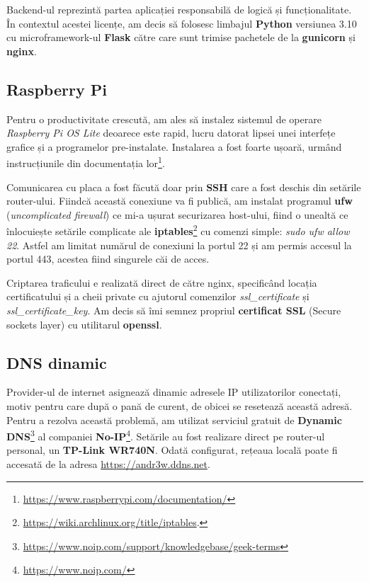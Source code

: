Backend-ul reprezintă partea aplicației responsabilă de logică și funcționalitate. În contextul acestei licențe, am decis să folosesc limbajul \textbf{Python} versiunea 3.10 cu microframework-ul \textbf{Flask} către care sunt trimise pachetele de la \textbf{gunicorn} și \textbf{nginx}.

\subsection{Raspberry Pi}

Pentru o productivitate crescută, am ales să instalez sistemul de operare \emph{Raspberry Pi OS Lite} deoarece este rapid, lucru datorat lipsei unei interfețe grafice și a programelor pre-instalate. Instalarea a fost foarte ușoară, urmând instrucțiunile din documentația lor\footnote{\url{https://www.raspberrypi.com/documentation/}}.

Comunicarea cu placa a fost făcută doar prin \textbf{SSH} care a fost deschis din setările router-ului. Fiindcă această conexiune va fi publică, am instalat programul \textbf{ufw} (\emph{uncomplicated firewall}) ce mi-a ușurat securizarea host-ului, fiind o unealtă ce înlocuiește setările complicate ale \textbf{iptables}\footnote{\url{https://wiki.archlinux.org/title/iptables}.} cu comenzi simple: \emph{sudo ufw allow 22}. Astfel am limitat numărul de conexiuni la portul 22 și am permis accesul la portul 443, acestea fiind singurele  căi de acces.

Criptarea traficului e realizată direct de către nginx, specificând locația certificatului și a cheii private cu ajutorul comenzilor \emph{ssl\_certificate} și \emph{ssl\_certificate\_key}. Am decis să îmi semnez propriul \textbf{certificat SSL} (Secure sockets layer) cu utilitarul \textbf{openssl}.

\subsection{DNS dinamic}

Provider-ul de internet asignează dinamic adresele IP utilizatorilor conectați, motiv pentru care după o pană de curent, de obicei se resetează această adresă. Pentru a rezolva această problemă, am utilizat serviciul gratuit de \textbf{Dynamic DNS}\footnote{\url{https://www.noip.com/support/knowledgebase/geek-terms}} al companiei \textbf{No-IP}\footnote{\url{https://www.noip.com/}}. Setările au fost realizare direct pe router-ul personal, un \textbf{TP-Link WR740N}. Odată configurat, rețeaua locală poate fi accesată de la adresa \url{https://andr3w.ddns.net}.

